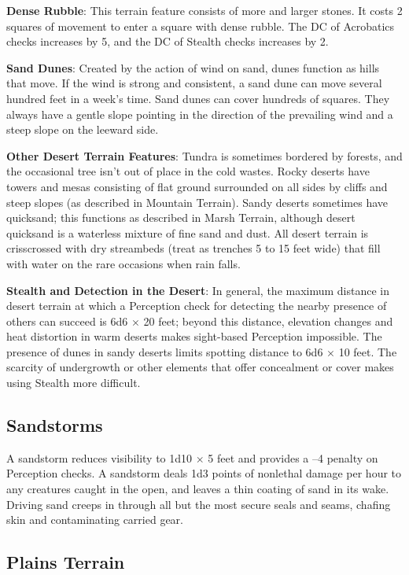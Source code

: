 \textbf{Dense Rubble}: This terrain feature consists of more and larger stones. It costs 2 squares of movement to enter a square with dense rubble. The DC of Acrobatics checks increases by 5, and the DC of Stealth checks increases by 2.
				
\textbf{Sand Dunes}: Created by the action of wind on sand, dunes function as hills that move. If the wind is strong and consistent, a sand dune can move several hundred feet in a week's time. Sand dunes can cover hundreds of squares. They always have a gentle slope pointing in the direction of the prevailing wind and a steep slope on the leeward side.
				
\textbf{Other Desert Terrain Features}: Tundra is sometimes bordered by forests, and the occasional tree isn't out of place in the cold wastes. Rocky deserts have towers and mesas consisting of flat ground surrounded on all sides by cliffs and steep slopes (as described in Mountain Terrain). Sandy deserts sometimes have quicksand; this functions as described in Marsh Terrain, although desert quicksand is a waterless mixture of fine sand and dust. All desert terrain is crisscrossed with dry streambeds (treat as trenches 5 to 15 feet wide) that fill with water on the rare occasions when rain falls.
				
\textbf{Stealth and Detection in the Desert}: In general, the maximum distance in desert terrain at which a Perception check for detecting the nearby presence of others can succeed is 6d6 \mbox{$\times$} 20 feet; beyond this distance, elevation changes and heat distortion in warm deserts makes sight-based Perception impossible. The presence of dunes in sandy deserts limits spotting distance to 6d6 \mbox{$\times$} 10 feet. The scarcity of undergrowth or other elements that offer concealment or cover makes using Stealth more difficult.
				
\subsection{Sandstorms}

				
A sandstorm reduces visibility to 1d10 \mbox{$\times$} 5 feet and provides a --4 penalty on Perception checks. A sandstorm deals 1d3 points of nonlethal damage per hour to any creatures caught in the open, and leaves a thin coating of sand in its wake. Driving sand creeps in through all but the most secure seals and seams, chafing skin and contaminating carried gear. 
				
\subsection{Plains Terrain}

